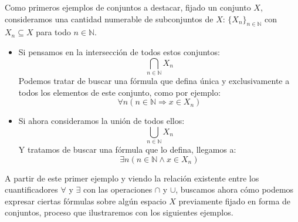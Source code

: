 \begin{ejemplo}
    Como primeros ejemplos de conjuntos a destacar, fijado un conjunto $X$, consideramos una cantidad numerable de subconjuntos de $X$: $\{X_n\}_{n\in \mathbb{N}}$ con $X_n\subseteq X$ para todo $n\in \mathbb{N}$.
    \begin{itemize}
        \item Si pensamos en la intersección de todos estos conjuntos:
            \begin{equation*}
                \bigcap_{n\in \mathbb{N}} X_n
            \end{equation*}
            Podemos tratar de buscar una fórmula que defina única y exclusivamente a todos los elementos de este conjunto, como por ejemplo:
            \begin{equation*}
                \forall n(n\in \mathbb{N} \Longrightarrow x\in X_n)
            \end{equation*}
        \item Si ahora consideramos la unión de todos ellos: 
            \begin{equation*}
                \bigcup_{n\in \mathbb{N}}X_n
            \end{equation*}
            Y tratamos de buscar una fórmula que lo defina, llegamos a:
            \begin{equation*}
                \exists n(n\in \mathbb{N} \land x\in X_n)
            \end{equation*}
    \end{itemize}
\end{ejemplo}

A partir de este primer ejemplo y viendo la relación existente entre los cuantificadores $\forall $ y $\exists $ con las operaciones $\cap$ y $\cup$, buscamos ahora cómo podemos expresar ciertas fórmulas sobre algún espacio $X$ previamente fijado en forma de conjuntos, proceso que ilustraremos con los siguientes ejemplos.

